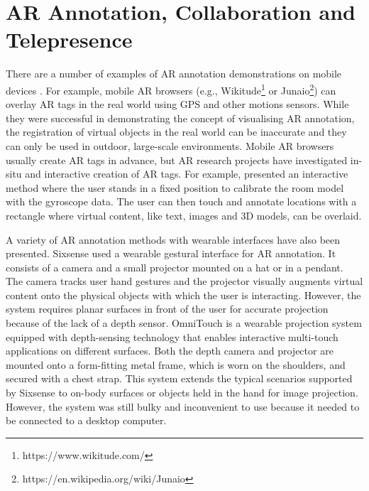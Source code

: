
\section{AR Annotation, Collaboration and Telepresence}

There are a number of examples of AR annotation demonstrations on mobile devices \cite{Wither2009a, Gauglitz2014, Larabi2018, Grasset2012}. For example, mobile AR browsers (e.g., Wikitude\footnote{https://www.wikitude.com/} or Junaio\footnote{https://en.wikipedia.org/wiki/Junaio}) can overlay AR tags in the real world using GPS and other motions sensors. While they were successful in demonstrating the concept of visualising AR annotation, the registration of virtual objects in the real world can be inaccurate and they can only be used in outdoor, large-scale environments. Mobile AR browsers usually create AR tags in advance, but  AR research projects have investigated in-situ and interactive creation of AR tags. For example, \cite{Kim2011} presented an interactive method where the user stands in a fixed position to calibrate the room model with the gyroscope data. The user can then touch and annotate locations with a rectangle where virtual content, like text, images and 3D models, can be overlaid. 

A variety of AR annotation methods with wearable interfaces have also been presented. Sixsense \cite{Mistry2009} used a wearable gestural interface for AR annotation. It consists of a camera and a small projector mounted on a hat or in a pendant. The camera tracks user hand gestures and the projector visually augments virtual content onto the physical objects with which the user is interacting. However, the system requires planar surfaces in front of the user for accurate projection because of the lack of a depth sensor. OmniTouch \cite{Hollerer1999a} is a wearable projection system equipped with depth-sensing technology that enables interactive multi-touch applications on different surfaces. Both the depth camera and projector are mounted onto a form-fitting metal frame, which is worn on the shoulders, and secured with a chest strap. This system extends the typical scenarios supported by Sixsense to on-body surfaces or objects held in the hand for image projection. However, the system was still bulky and inconvenient to use because it needed to be connected to a desktop computer.

